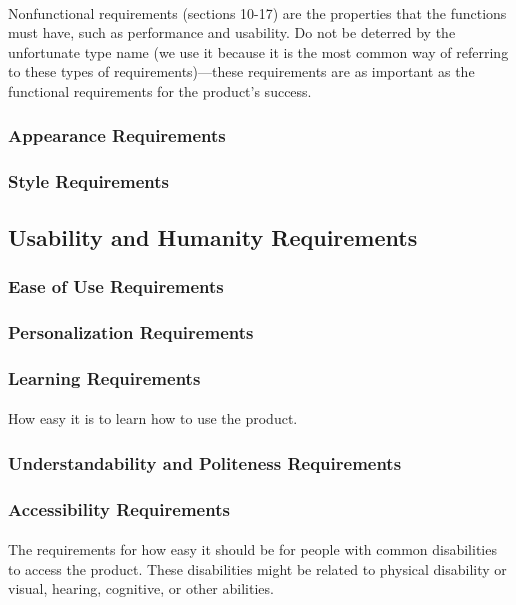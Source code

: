\documentclass[12pt,a4paper]{article}
\begin{document}
\paragraph{}
Nonfunctional requirements (sections 10-17) are the properties that the functions must have, such as performance and usability. Do not be deterred by the unfortunate type name (we use it because it is the most common way of referring to these types of requirements)—these requirements are as important as the functional requirements for the product’s success.
\subsubsection{Appearance Requirements}
\subsubsection{Style Requirements}
\subsection{Usability and Humanity Requirements}
\subsubsection{Ease of Use Requirements}
\subsubsection{Personalization Requirements}
\subsubsection{Learning Requirements}
\paragraph{}
How easy it is to learn how to use the product.
\subsubsection{Understandability and Politeness Requirements}
\subsubsection{Accessibility Requirements}
\paragraph{}
The requirements for how easy it should be for people with common disabilities to access the product. These disabilities might be related to physical disability or visual, hearing, cognitive, or other abilities.
\pagebreak
\end{document}
